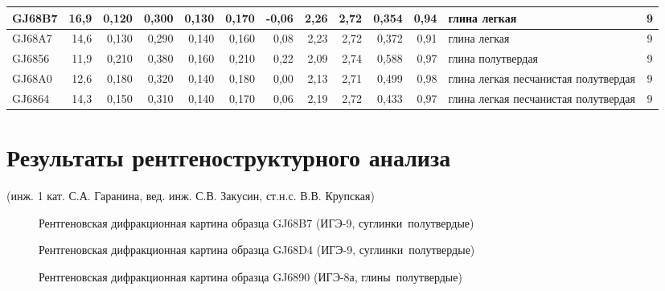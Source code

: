 \begin{table}
\begin{tabular}{@{}|l|r|r|r|r|r|r|r|r|r|r|l|c|@{}}
    GJ68B7          & 16,9       & 0,120                        & 0,300   & 0,130  & 0,170  & -0,06    & 2,26     & 2,72      & 0,354   & 0,94     & глина легкая       & 9   \\ \hline
    GJ68A7          & 14,6       & 0,130                        & 0,290   & 0,140  & 0,160  & 0,08     & 2,23     & 2,72      & 0,372   & 0,91     & глина легкая                              & 9   \\ \hline
    GJ6856          & 11,9       & 0,210                        & 0,380   & 0,160  & 0,210  & 0,22     & 2,09     & 2,74      & 0,588   & 0,97     & глина полутвердая                            & 9   \\ \hline
    GJ68A0          & 12,6       & 0,180                        & 0,320   & 0,140  & 0,180  & 0,00     & 2,13     & 2,71      & 0,499   & 0,98     & глина легкая   песчанистая полутвердая       & 9   \\ \hline
    GJ6864          & 14,3       & 0,150                        & 0,310   & 0,140  & 0,170  & 0,06     & 2,19     & 2,72      & 0,433   & 0,97     & глина легкая   песчанистая полутвердая       & 9   \\ \hline
    \bottomrule 
    \end{tabular}
    \end{table}


\chapter{Результаты рентгеноструктурного анализа}\label{app:difrac}
(инж. 1 кат. С.А. Гаранина, вед. инж. С.В. Закусин, ст.н.с. В.В. Крупская)

\begin{figure}[ht]
    \caption{Рентгеновская дифракционная картина образца GJ68B7 (ИГЭ-9, суглинки полутвердые)}\label{fig:fig}
  \end{figure}

  \begin{figure}[ht]
    \caption{Рентгеновская дифракционная картина образца GJ68D4 (ИГЭ-9, суглинки полутвердые)}\label{fig:fig}
  \end{figure}

  \begin{figure}[ht]
    \caption{Рентгеновская дифракционная картина образца GJ6890 (ИГЭ-8а, глины полутвердые)}\label{fig:fig}
  \end{figure}

